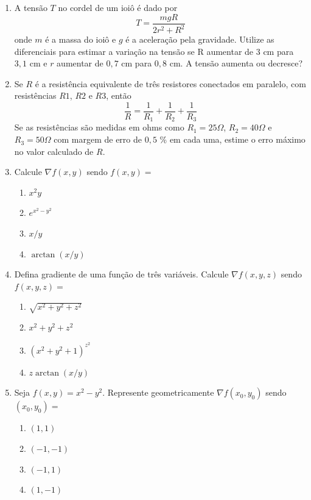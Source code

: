 \documentclass[11pt,a4paper]{article}
\begin{document}
\begin{enumerate}
	\item A tensão $T$ no cordel de um ioiô é dado por
	$$T = \displaystyle\frac{mgR}{2r^2 + R^2}$$
	onde $m$ é a massa do ioiô e $g$ é a aceleração pela gravidade. Utilize as diferenciais para estimar a variação na tensão se R aumentar de $3$ cm para $3,1$ cm e $r$ aumentar de $0,7$ cm para $0,8$ cm. A tensão aumenta ou decresce? 
	
	\item Se $R$ é a resistência equivalente de três resistores conectados em paralelo, com resistências $R1$, $R2$ e $R3$, então
	$$\displaystyle\frac{1}{R} = \displaystyle\frac{1}{R_1} + \displaystyle\frac{1}{R_2} + \displaystyle\frac{1}{R_3}$$
	Se as resistências são medidas em ohms como $R_1 = 25 \Omega$, $R_2 = 40 \Omega$ e $R_3 = 50 \Omega$ com margem de erro de $0,5$ \% em cada uma, estime o erro máximo no valor calculado de $R$. 
	
	\item Calcule $\nabla f(x,y)$ sendo $f(x,y) = $
	 \begin{enumerate}
	 	\item $x^2y$
	 	\item $e^{x^2 - y^2}$
	 	\item $x/y$
	 	\item $\arctan (x/y)$
	 	
	 \end{enumerate}
	 
	\item Defina gradiente de uma função de três variáveis. Calcule $\nabla f(x,y,z)$ sendo $f(x,y,z) = $
	 	 \begin{enumerate}
	 	 	\item $\sqrt{x^2 + y^2 + z^2}$
	 	 	\item $x^2 + y^2 + z^2$
	 	 	\item $(x^2 + y^2 + 1)^{z^2}$
	 	 	\item $z \arctan (x/y)$
	 	 \end{enumerate}
	 
	 \item Seja $f(x,y) = x^2 - y^2$. Represente geometricamente $\nabla f(x_0,y_0)$ sendo $(x_0, y_0) = $
	 \begin{enumerate}
	 	\item $(1,1)$
	 	\item $(-1,-1)$
	 	\item $(-1,1)$
	 	\item $(1,-1)$
	 \end{enumerate}
	 

\end{enumerate}
\end{document}
